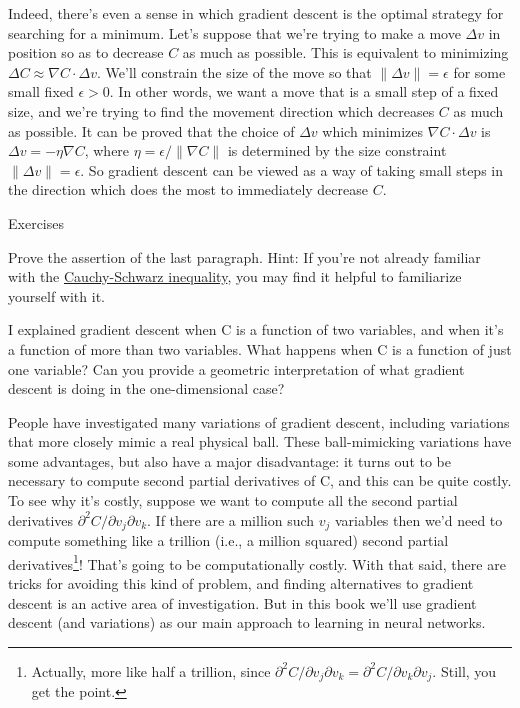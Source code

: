 \documentclass[a4paper,twoside,10pt]{book}
\begin{document}
Indeed, there's even a sense in which gradient descent is the optimal strategy for searching for a minimum. Let's suppose that we're trying to make a move $\Delta v$ in position so as to decrease $C$ as much as possible. This is equivalent to minimizing $\Delta C \approx \nabla C \cdot \Delta v$. We'll constrain the size of the move so that $\|\Delta v\| = \epsilon$ for some small fixed $\epsilon > 0$. In other words, we want a move that is a small step of a fixed size, and we're trying to find the movement direction which decreases $C$ as much as possible. It can be proved that the choice of $\Delta v$ which minimizes $\nabla C \cdot \Delta v$ is $\Delta v = - \eta \nabla C$, where $\eta = \epsilon / \|\nabla C\|$ is determined by the size constraint $\|\Delta v\| = \epsilon$. So gradient descent can be viewed as a way of taking small steps in the direction which does the most to immediately decrease $C$.

\begin{exercize}{Exercises}
\item Prove the assertion of the last paragraph. Hint: If you're not already familiar with the \href{http://en.wikipedia.org/wiki/Cauchy\%E2\%80\%93Schwarz_inequality}{Cauchy-Schwarz inequality}, you may find it helpful to familiarize yourself with it.
\item I explained gradient descent when C is a function of two variables, and when it's a function of more than two variables. What happens when C is a function of just one variable? Can you provide a geometric interpretation of what gradient descent is doing in the one-dimensional case?
\end{exercize}

People have investigated many variations of gradient descent, including variations that more closely mimic a real physical ball. These ball-mimicking variations have some advantages, but also have a major disadvantage: it turns out to be necessary to compute second partial derivatives of C, and this can be quite costly. To see why it's costly, suppose we want to compute all the second partial derivatives $\partial^2 C/ \partial v_j \partial v_k$. If there are a million such $v_j$ variables then we'd need to compute something like a trillion (i.e., a million squared) second partial derivatives\footnote{Actually, more like half a trillion, since $\partial^2 C/ \partial v_j \partial v_k = \partial^2 C/ \partial v_k \partial v_j$. Still, you get the point.}! That's going to be computationally costly. With that said, there are tricks for avoiding this kind of problem, and finding alternatives to gradient descent is an active area of investigation. But in this book we'll use gradient descent (and variations) as our main approach to learning in neural networks.
\end{document}
